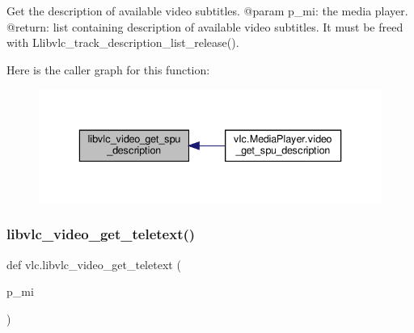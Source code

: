 \begin{DoxyVerb}Get the description of available video subtitles.
@param p_mi: the media player.
@return: list containing description of available video subtitles. It must be freed with L{libvlc_track_description_list_release}().
\end{DoxyVerb}
 Here is the caller graph for this function\+:
\nopagebreak
\begin{figure}[H]
\begin{center}
\leavevmode
\includegraphics[width=336pt]{namespacevlc_a4dee99f1b8023bb53f698403c94b2573_icgraph}
\end{center}
\end{figure}
\mbox{\label{namespacevlc_a5109017fbef0af0ea955b6aad723b1e3}} 
\subsubsection{\texorpdfstring{libvlc\+\_\+video\+\_\+get\+\_\+teletext()}{libvlc\_video\_get\_teletext()}}
{\footnotesize\ttfamily def vlc.\+libvlc\+\_\+video\+\_\+get\+\_\+teletext (\begin{DoxyParamCaption}\item[{}]{p\+\_\+mi }\end{DoxyParamCaption})}

